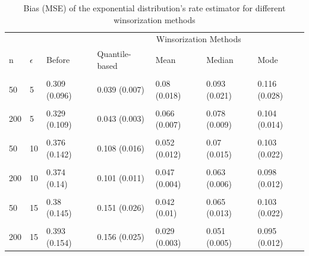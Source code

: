 \documentclass[
]{article}
\begin{document}
\begin{CodeChunk}
\begin{table}[H]

\caption{\label{tab:unnamed-chunk-7}Bias (MSE) of the exponential distribution's rate estimator for different winsorization methods}
\centering
\begin{tabular}[t]{l|l|l|l|l|l|l}
\hline
\multicolumn{3}{c|}{ } & \multicolumn{4}{c}{Winsorization Methods} \\
\cline{4-7}
n & $\epsilon$ & Before & Quantile-based & Mean & Median & Mode\\
\hline
\cellcolor{gray!6}{20} & \cellcolor{gray!6}{5} & \cellcolor{gray!6}{0.359 (0.13)} & \cellcolor{gray!6}{0.069 (0.017)} & \cellcolor{gray!6}{0.077 (0.033)} & \cellcolor{gray!6}{0.092 (0.037)} & \cellcolor{gray!6}{0.115 (0.045)}\\
\hline
50 & 5 & 0.309 (0.096) & 0.039 (0.007) & 0.08 (0.018) & 0.093 (0.021) & 0.116 (0.028)\\
\hline
\cellcolor{gray!6}{100} & \cellcolor{gray!6}{5} & \cellcolor{gray!6}{0.335 (0.113)} & \cellcolor{gray!6}{0.045 (0.004)} & \cellcolor{gray!6}{0.07 (0.01)} & \cellcolor{gray!6}{0.082 (0.012)} & \cellcolor{gray!6}{0.107 (0.018)}\\
\hline
200 & 5 & 0.329 (0.109) & 0.043 (0.003) & 0.066 (0.007) & 0.078 (0.009) & 0.104 (0.014)\\
\hline
\cellcolor{gray!6}{20} & \cellcolor{gray!6}{10} & \cellcolor{gray!6}{0.382 (0.147)} & \cellcolor{gray!6}{0.13 (0.025)} & \cellcolor{gray!6}{0.055 (0.024)} & \cellcolor{gray!6}{0.076 (0.029)} & \cellcolor{gray!6}{0.106 (0.038)}\\
\hline
50 & 10 & 0.376 (0.142) & 0.108 (0.016) & 0.052 (0.012) & 0.07 (0.015) & 0.103 (0.022)\\
\hline
\cellcolor{gray!6}{100} & \cellcolor{gray!6}{10} & \cellcolor{gray!6}{0.375 (0.141)} & \cellcolor{gray!6}{0.102 (0.012)} & \cellcolor{gray!6}{0.051 (0.007)} & \cellcolor{gray!6}{0.069 (0.009)} & \cellcolor{gray!6}{0.103 (0.016)}\\
\hline
200 & 10 & 0.374 (0.14) & 0.101 (0.011) & 0.047 (0.004) & 0.063 (0.006) & 0.098 (0.012)\\
\hline
\cellcolor{gray!6}{20} & \cellcolor{gray!6}{15} & \cellcolor{gray!6}{0.395 (0.157)} & \cellcolor{gray!6}{0.179 (0.038)} & \cellcolor{gray!6}{0.038 (0.018)} & \cellcolor{gray!6}{0.064 (0.022)} & \cellcolor{gray!6}{0.1 (0.032)}\\
\hline
50 & 15 & 0.38 (0.145) & 0.151 (0.026) & 0.042 (0.01) & 0.065 (0.013) & 0.103 (0.022)\\
\hline
\cellcolor{gray!6}{100} & \cellcolor{gray!6}{15} & \cellcolor{gray!6}{0.393 (0.155)} & \cellcolor{gray!6}{0.159 (0.026)} & \cellcolor{gray!6}{0.03 (0.004)} & \cellcolor{gray!6}{0.053 (0.007)} & \cellcolor{gray!6}{0.096 (0.014)}\\
\hline
200 & 15 & 0.393 (0.154) & 0.156 (0.025) & 0.029 (0.003) & 0.051 (0.005) & 0.095 (0.012)\\
\hline
\end{tabular}
\end{table}

\end{CodeChunk}
\end{document}
